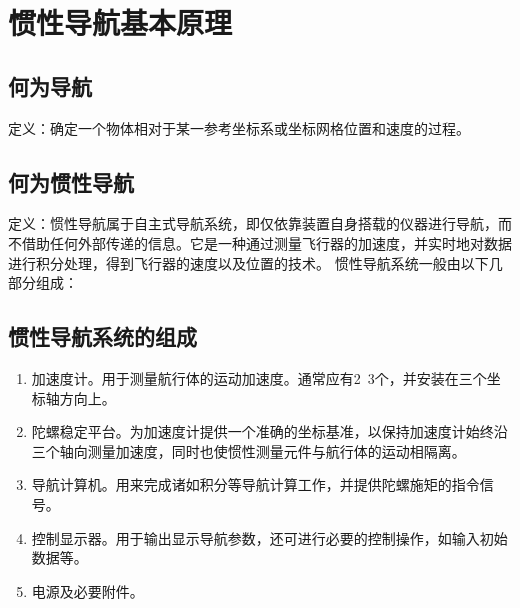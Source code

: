 

\section{惯性导航基本原理\cite{1}}
\subsection{何为导航\cite{2}}
定义：确定一个物体相对于某一参考坐标系或坐标网格位置和速度的过程。
\subsection{何为惯性导航}
定义：惯性导航属于自主式导航系统，即仅依靠装置自身搭载的仪器进行导航，而不借助任何外部传递的信息。它是一种通过测量飞行器的加速度，并实时地对数据进行积分处理，得到飞行器的速度以及位置的技术。
惯性导航系统一般由以下几部分组成：
\subsection{惯性导航系统的组成}
\begin{enumerate}
\item 加速度计。用于测量航行体的运动加速度。通常应有2~3个，并安装在三个坐标轴方向上。
\item 陀螺稳定平台。为加速度计提供一个准确的坐标基准，以保持加速度计始终沿三个轴向测量加速度，同时也使惯性测量元件与航行体的运动相隔离。
\item 导航计算机。用来完成诸如积分等导航计算工作，并提供陀螺施矩的指令信号。
\item 控制显示器。用于输出显示导航参数，还可进行必要的控制操作，如输入初始数据等。
\item 电源及必要附件。
\end{enumerate}
